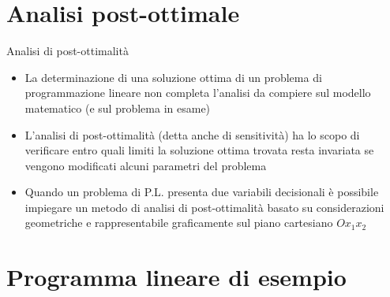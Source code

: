 \documentclass{beamer}
\begin{document}
\generatitolo

\section{Analisi post-ottimale}

\begin{frame}{Analisi di post-ottimalit\`a}
  \begin{itemize}
  \item La determinazione di una soluzione ottima di un problema di programmazione
  lineare non completa l'analisi da compiere sul modello matematico
  (e sul problema in esame)

  \item L'analisi di post-ottimalit\`a (detta anche di sensitività) ha lo scopo di
  verificare entro quali limiti la soluzione ottima trovata resta invariata se
  vengono modificati alcuni parametri del problema

  \item Quando un problema di P.L. presenta due variabili decisionali è possibile
  impiegare un metodo di analisi di post-ottimalità basato su considerazioni
  geometriche e rappresentabile graficamente sul piano cartesiano $Ox_1x_2$
  \end{itemize}
\end{frame}

\section{Programma lineare di esempio}
\end{document}
